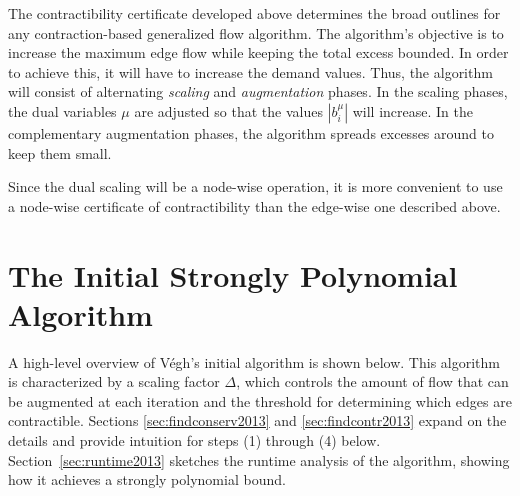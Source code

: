 \documentclass[11pt]{article}
\theoremstyle{definition}
\theoremstyle{definition}
\theoremstyle{definition}
\newcommand{\biu}{b_{i}^{\mu}}
\begin{document}
    The contractibility certificate developed above determines the broad outlines
    for any contraction-based generalized flow algorithm. The algorithm's objective
    is to increase the maximum edge flow while keeping the total excess bounded.
    In order to achieve this, it will have to increase the demand values. Thus, the algorithm
    will consist of alternating \emph{scaling} and \emph{augmentation} phases.
    In the scaling phases, the dual variables $\mu$ are adjusted so that
    the values $|\biu|$ will increase. In the complementary augmentation phases,
    the algorithm spreads excesses around to keep them small.
    
    Since the dual scaling will be a node-wise operation, it is more convenient
    to use a node-wise certificate of contractibility than the edge-wise one described
    above.
    

\section{The Initial Strongly Polynomial Algorithm}
\label{sec:2013}
    \label{sec:2013-notation}





A high-level overview of Végh's initial algorithm \cite{Vegh2013}
is shown below. This algorithm is characterized by a scaling factor $\Delta$,
which controls the amount of flow that can be augmented at each iteration and the threshold for
determining which edges are contractible. Sections \ref{sec:findconserv2013} and
\ref{sec:findcontr2013} expand on the details and provide intuition for steps
(1) through (4) below. Section~\ref{sec:runtime2013} sketches the runtime
analysis of the algorithm, showing how it achieves a strongly polynomial bound.
\end{document}

